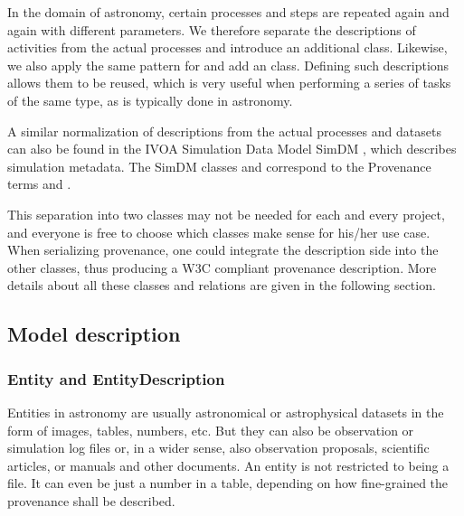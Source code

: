 In the domain of astronomy, certain processes and steps are repeated again and 
again with different parameters. We therefore separate the descriptions of activities
from the actual processes and introduce an additional  class.
Likewise, we also apply the same pattern for  and add an 
class.
Defining such descriptions allows them to be reused, which is very useful 
when performing a series of tasks of the same type, as is typically done in 
astronomy. 

A similar normalization of descriptions from the actual processes and datasets 
can also be found in the IVOA Simulation Data Model SimDM \citep{std:SimDM}, 
which describes simulation metadata. The SimDM classes  and  
correspond to the Provenance terms  and .


This separation into two classes may not be needed for each and every project,
and everyone is free to choose which classes make sense for his/her use case.
When serializing provenance, one could integrate the description side into the 
other classes, thus producing a W3C compliant provenance description. More details about 
all these classes and relations are given in the following section.





\subsection{Model description}
\subsubsection{Entity and EntityDescription}
Entities in astronomy are usually astronomical or astrophysical datasets in the 
form of images, tables, numbers, etc. But they can also be observation or 
simulation log files or, in a wider sense, also observation proposals, scientific 
articles, or manuals and other documents. An entity is not restricted to being
a file. 
It can even be just a number in a table, depending on how fine-grained the 
provenance shall be described.

